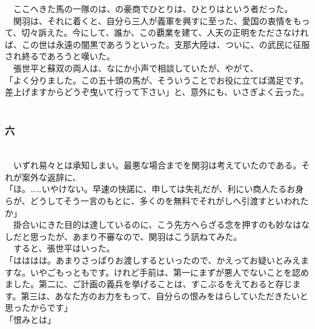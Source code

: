 \documentclass[
  paper=a5,
  fontsize=10pt,
  jafontsize=9.5pt,
  tate,                  %
  open_bracket_pos=nibu, %
]{jlreq}
\begin{document}
　ここへきた馬の一隊のは、の豪商でひとりは、ひとりはという者だった。\\


　関羽は、それに着くと、自分ら三人が義軍を興すに至った、愛国の衷情をもって、切々訴えた。今にして、誰か、この覇業を建て、人天の正明をたださなければ、この世は永遠の闇黒であろうといった。支那大陸は、ついに、の武民に征服され終るであろうと嘆いた。\\


　張世平と蘇双の両人は、なにか小声で相談していたが、やがて、\\


「よく分りました。この五十頭の馬が、そういうことでお役に立てば満足です。差上げますからどうぞ曳いて行って下さい」と、意外にも、いさぎよく云った。\\

\\

\subsubsection{六}

\\


　いずれ易々とは承知しまい。最悪な場合までを関羽は考えていたのである。それが案外な返辞に、\\


「ほ。……いやけない。早速の快諾に、申しては失礼だが、利にい商人たるお身らが、どうしてそう一言のもとに、多くのを無料でそれがしへ引渡すといわれたか」\\


　掛合いにきた目的は達しているのに、こう先方へらざる念を押すのも妙なはなしだと思ったが、あまり不審なので、関羽はこう訊ねてみた。\\


　すると、張世平はいった。\\


「はははは。あまりさっぱりお渡しするといったので、かえってお疑いとみえますな。いやごもっともです。けれど手前は、第一にまずが悪人でないことを認めました。第二に、ご計画の義兵を挙げることは、すこぶるをえておると存じます。第三は、あなた方のお力をもって、自分らの恨みをはらしていただきたいと思ったからです」\\


「恨みとは」\\
\end{document}
